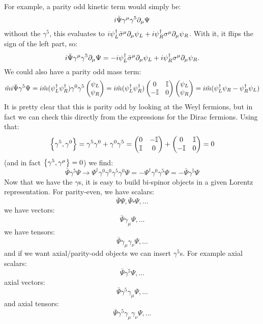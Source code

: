 For example, a parity odd kinetic term would simply be:
\begin{equation}
    i\bar{\Psi}\gamma^\mu \gamma^5\partial_\mu \Psi
\end{equation}
without the $\gamma^5$, this evaluates to $i\psi^\dagger_L \bar{\sigma}^\mu \partial_\mu \psi_L + i\psi_R^\dagger \sigma^\mu \partial_\mu \psi_R$. With it, it flips the sign of the left part, so:
\begin{equation}
    i\bar{\Psi}\gamma^\mu \gamma^5\partial_\mu \Psi = -i\psi^\dagger_L \bar{\sigma}^\mu \partial_\mu \psi_L + i\psi_R^\dagger \sigma^\mu \partial_\mu \psi_R.
\end{equation}
We could also have a parity odd mass term:
\begin{equation}
    \tilde{m}i\bar{\Psi}\gamma^5 \Psi = i\tilde{m}(\psi_L^\dagger \psi_R^\dagger)\gamma^0 \gamma^5 \begin{pmatrix}\psi_L \\ \psi_R\end{pmatrix} = i\tilde{m}(\psi_L^\dagger \psi_R^\dagger)\begin{pmatrix}0 & \mathbb{I} \\ -\mathbb{I} & 0\end{pmatrix} \begin{pmatrix}\psi_L \\ \psi_R\end{pmatrix} = i\tilde{m}(\psi_L^\dagger\psi_R - \psi_R^\dagger\psi_L)
\end{equation}
It is pretty clear that this is parity odd by looking at the Weyl fermions, but in fact we can check this directly from the expressions for the Dirac fermions. Using that:
\begin{equation}
    \set{\gamma^5, \gamma^0} = \gamma^5\gamma^0 + \gamma^0 \gamma^5 = \begin{pmatrix}0 & -\mathbb{I} \\ \mathbb{I} & 0\end{pmatrix} + \begin{pmatrix}0 & \mathbb{I} \\ -\mathbb{I} & 0\end{pmatrix} = 0
\end{equation}
(and in fact $\set{\gamma^5, \gamma^\mu} = 0$) we find:
\begin{equation}
    \bar{\Psi}\gamma^5\Psi \to \Psi^\dag \gamma^0\gamma^0\gamma^5\gamma^0\Psi = -\Psi^\dag \gamma^0\gamma^5 \Psi = -\bar{\Psi}\gamma^5\Psi
\end{equation}
Now that we have the $\gamma$s, it is easy to build bi-spinor objects in a given Lorentz representation. For parity-even, we have scalars:
\begin{equation}
    \bar{\Psi}\Psi, \bar{\Psi}\square\Psi, \ldots
\end{equation}
we have vectors:
\begin{equation}
    \bar{\Psi}\gamma_\mu\Psi, \ldots
\end{equation}
we have tensors:
\begin{equation}
    \bar{\Psi}\gamma_\mu\gamma_\nu\Psi, \ldots
\end{equation}
and if we want axial/parity-odd objects we can insert $\gamma^5$s. For example axial scalars:
\begin{equation}
    \bar{\Psi}\gamma^5\Psi, \ldots
\end{equation}
axial vectors:
\begin{equation}
    \bar{\Psi}\gamma^5\gamma_\mu \Psi, \ldots
\end{equation}
and axial tensors:
\begin{equation}
    \bar{\Psi}\gamma^5\gamma_\mu\gamma_\nu \Psi, \ldots
\end{equation}